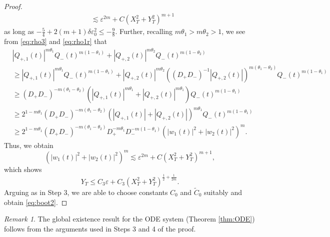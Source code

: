 \documentclass[11pt,a4paper,twosides]{amsart}
\theoremstyle{plain}
\theoremstyle{remark}
\newtheorem{remark}[theorem]{Remark}
\numberwithin{equation}{section}
\def\({\left(}
\def\){\right)}
\def\le{\leqslant}
\def\ge{\geqslant}
\newcommand{\eps}{\varepsilon}
\theoremstyle{definition}
\newcommand{\1}{{\bf 1}_{\{|x| < |t|\}}}
\renewcommand{\epsilon}{\varepsilon}
\renewcommand{\tilde}{\widetilde}
\begin{document}
\begin{proof}
\begin{equation}
\begin{aligned}
     &\lesssim \eps^{2m} + C (X_T^2+Y_T^2)^{m+1}
\end{aligned}
\end{equation}
as long as $-\frac{5}{4}+2(m+1)\delta\epsilon_0^2 \le -\frac98$.
Further, recalling $m\theta_1>m\theta_2>1$, we see 
 from \eqref{eq:rho3} and \eqref{eq:rho1r} that 
  \begin{align*}
    & |Q_{+,1}(t)|^{m\theta_1}Q_-(t)^{m(1-\theta_1)}
    +  |Q_{+,2}(t)|^{m\theta_2}Q_-(t)^{m(1-\theta_2)}\\
    &\ge |Q_{+,1}(t)|^{m\theta_1}Q_-(t)^{m(1-\theta_1)}
    + |Q_{+,2}(t)|^{m\theta_2}\((D_+D_-)^{-1}|Q_{+,2}(t)|\)^{m (\theta_1-\theta_2)}Q_-(t)^{m(1-\theta_1)}\\
    &\ge (D_+D_-)^{-m(\theta_1-\theta_2)} (|Q_{+,1}(t)|^{m\theta_1}+ |Q_{+,2}(t)|^{m\theta_1})Q_-(t)^{m(1-\theta_1)}\\
    &\ge 2^{1-m\theta_1} (D_+D_-)^{-m(\theta_1-\theta_2)} (|Q_{+,1}(t)|+ |Q_{+,2}(t)|)^{m\theta_1}Q_-(t)^{m(1-\theta_1)}\\
    &\ge 2^{1-m\theta_1}  (D_+D_-)^{-m(\theta_1-\theta_2)}  D_+^{-m\theta_1}D_-^{-m(1-\theta_1)}
   (|w_1(t)|^2+ |w_2(t)|^2)^{m}.
  \end{align*}
Thus, we obtain
\[
	(|w_1(t)|^2+ |w_2(t)|^2)^{m}
	\lesssim \eps^{2m} + C (X_T^2+Y_T^2)^{m+1},
\]
which shows
\begin{equation}\label{eq:YT2}
	Y_T	\le C_3 \eps + C_3 (X_T^2+Y_T^2)^{\frac12+ \frac1{2m}}. 
\end{equation}
Arguing as in Step 3, we are able to choose constants $C_0$ and $\tilde{C}_0$ suitably and
obtain \eqref{eq:boot2}.
%
\end{proof}

\begin{remark}
The global existence result for the ODE system (Theorem \ref{thm:ODE}) follows 
from the arguments used in Steps 3 and 4 of the proof.
\end{remark}
\end{document}
